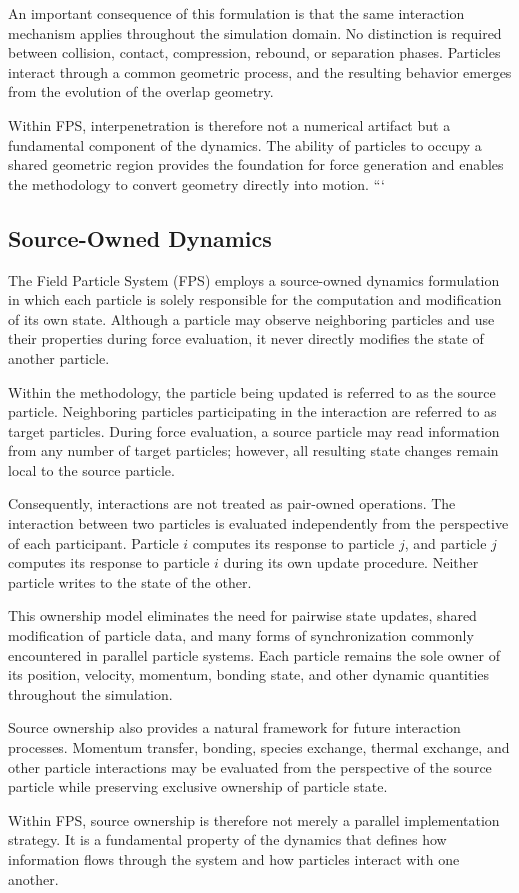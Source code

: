An important consequence of this formulation is that the
same interaction mechanism applies throughout the simulation
domain. No distinction is required between collision,
contact, compression, rebound, or separation phases.
Particles interact through a common geometric process, and
the resulting behavior emerges from the evolution of the
overlap geometry.

Within FPS, interpenetration is therefore not a numerical
artifact but a fundamental component of the dynamics. The
ability of particles to occupy a shared geometric region
provides the foundation for force generation and enables
the methodology to convert geometry directly into motion.
```
\subsection{Source-Owned Dynamics}

The Field Particle System (FPS) employs a source-owned
dynamics formulation in which each particle is solely
responsible for the computation and modification of its
own state. Although a particle may observe neighboring
particles and use their properties during force
evaluation, it never directly modifies the state of
another particle.

Within the methodology, the particle being updated is
referred to as the source particle. Neighboring particles
participating in the interaction are referred to as
target particles. During force evaluation, a source
particle may read information from any number of target
particles; however, all resulting state changes remain
local to the source particle.

Consequently, interactions are not treated as pair-owned
operations. The interaction between two particles is
evaluated independently from the perspective of each
participant. Particle \(i\) computes its response to
particle \(j\), and particle \(j\) computes its response
to particle \(i\) during its own update procedure.
Neither particle writes to the state of the other.

This ownership model eliminates the need for pairwise
state updates, shared modification of particle data, and
many forms of synchronization commonly encountered in
parallel particle systems. Each particle remains the sole
owner of its position, velocity, momentum, bonding state,
and other dynamic quantities throughout the simulation.

Source ownership also provides a natural framework for
future interaction processes. Momentum transfer, bonding,
species exchange, thermal exchange, and other particle
interactions may be evaluated from the perspective of the
source particle while preserving exclusive ownership of
particle state.

Within FPS, source ownership is therefore not merely a
parallel implementation strategy. It is a fundamental
property of the dynamics that defines how information
flows through the system and how particles interact with
one another.
